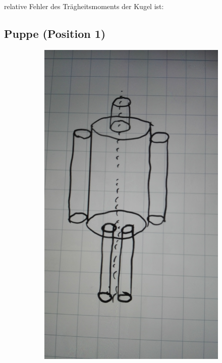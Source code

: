 \justifying relative Fehler des Trägheitsmoments der Kugel ist:


\subsection{Puppe (Position 1)}\justifying %

\begin{figure}[H]
\caption{Positionen der Puppe}
\begin{subfigure}{0.495\linewidth}
\centering
\includegraphics[width=\textwidth]{images/puppe_an.jpg}

\end{subfigure}
\end{figure}
